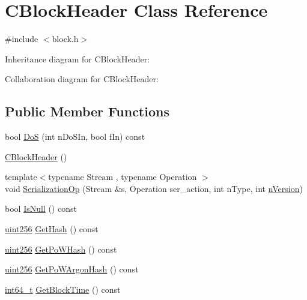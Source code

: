 \hypertarget{class_c_block_header}{}\section{C\+Block\+Header Class Reference}
\label{class_c_block_header}


{\ttfamily \#include $<$block.\+h$>$}



Inheritance diagram for C\+Block\+Header\+:


Collaboration diagram for C\+Block\+Header\+:
\subsection*{Public Member Functions}
\begin{DoxyCompactItemize}
\item 
bool \hyperlink{class_c_block_header_a514e4d5250fa700272ac467fecf7fa7b}{Do\+S} (int n\+Do\+S\+In, bool f\+In) const 
\item 
\hyperlink{class_c_block_header_a9afed57bea877bbd25b5eb6740c6990d}{C\+Block\+Header} ()
\item 
{\footnotesize template$<$typename Stream , typename Operation $>$ }\\void \hyperlink{class_c_block_header_ae564e96da45702d79c83e3ad0ce19873}{Serialization\+Op} (Stream \&s, Operation ser\+\_\+action, int n\+Type, int \hyperlink{class_c_block_header_ad64b7a76914741861f55f0f38ed66fb5}{n\+Version})
\item 
bool \hyperlink{class_c_block_header_a5c179f4a8b5728ba381a26d0450403b8}{Is\+Null} () const 
\item 
\hyperlink{classuint256}{uint256} \hyperlink{class_c_block_header_ae1165e54882d364b030fb33673d64dbd}{Get\+Hash} () const 
\item 
\hyperlink{classuint256}{uint256} \hyperlink{class_c_block_header_ace82f72f060caa4fd96759b4ff99a25e}{Get\+Po\+W\+Hash} () const 
\item 
\hyperlink{classuint256}{uint256} \hyperlink{class_c_block_header_a795e040a33329757f6b31dfbcabbb2a5}{Get\+Po\+W\+Argon\+Hash} () const 
\item 
\hyperlink{stdint_8h_adec1df1b8b51cb32b77e5b86fff46471}{int64\+\_\+t} \hyperlink{class_c_block_header_a2972ebc9d970b4b12434876263c4c2b5}{Get\+Block\+Time} () const 
\end{DoxyCompactItemize}
